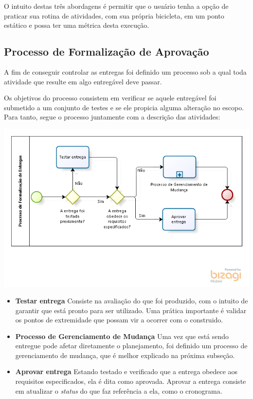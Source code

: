 O intuito destas três abordagens é permitir que o usuário tenha a opção de praticar sua rotina de atividades, com sua própria bicicleta, em um ponto estático e possa ter uma métrica desta execução.

\subsection{Processo de Formalização de Aprovação}

A fim de conseguir controlar as entregas foi definido um processo sob a qual toda atividade que resulte em algo entregável deve passar. 

Os objetivos do processo consistem em verificar se aquele entregável foi submetido a um conjunto de testes e se ele propicia alguma alteração no escopo. Para tanto, segue o processo juntamente com a descrição das atividades:

 \begin{center}
	\includegraphics[scale=0.9]{figuras/formalizacaoentregas}
\end{center} 

\begin{itemize}
\item \textbf{Testar entrega}
Consiste na avaliação do que foi produzido, com o intuito de garantir que está pronto para ser utilizado. Uma prática importante é validar os pontos de extremidade que possam vir a ocorrer com o construido.

\item \textbf{Processo de Gerenciamento de Mudança}
Uma vez que está sendo entregue pode afetar diretamente o planejamento, foi definido um processo de gerenciamento de mudança, que é melhor explicado na próxima subseção.

\item \textbf{Aprovar entrega}
Estando testado e verificado que a entrega obedece aos requisitos especificados, ela é dita como aprovada. Aprovar a entrega consiste em atualizar o \textit{status} do que faz referência a ela, como o cronograma. 
\end{itemize}

